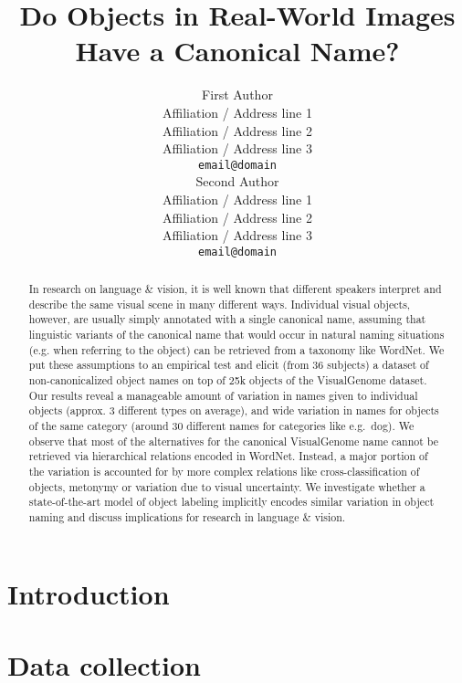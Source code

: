 \documentclass[11pt,a4paper]{article}
\title{Do Objects in Real-World Images Have a Canonical Name?}
\author{First Author \\
  Affiliation / Address line 1 \\
  Affiliation / Address line 2 \\
  Affiliation / Address line 3 \\
  {\tt email@domain} \\\And
  Second Author \\
  Affiliation / Address line 1 \\
  Affiliation / Address line 2 \\
  Affiliation / Address line 3 \\
  {\tt email@domain} \\}
\date{}
\newcommand{\cs}[1]{\textcolor{green}{\emph{//cs: #1//}}}
\begin{document}
\maketitle

\begin{abstract}
In research on language \& vision, it is well known that different speakers interpret and describe the same visual scene in many different ways.
Individual visual objects, however, are usually simply annotated with a single canonical name, assuming that linguistic variants of the canonical name that would occur in natural naming situations (e.g. when referring to the object) can be retrieved from a taxonomy like WordNet.
We put these assumptions to an empirical test and elicit (from 36 subjects) a dataset of non-canonicalized object names on top of 25k objects of the VisualGenome dataset. 
Our results reveal a manageable amount of variation in names given to individual objects (approx. 3 different types on average), and wide variation in names for objects of the same category (around 30 different names for categories like e.g.\ dog).
We observe that most of the alternatives for the canonical VisualGenome name cannot be retrieved via hierarchical relations encoded in WordNet. 
Instead, a major portion of the variation is accounted for by more complex relations like cross-classification of objects, metonymy or variation due to visual uncertainty.  
We investigate whether a state-of-the-art model of object labeling implicitly encodes similar variation in object naming and discuss implications for research in language \& vision.
\end{abstract}

\section{Introduction}


%

\section{Data collection}
%
\end{document}

